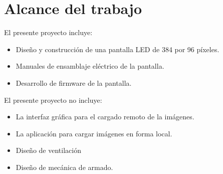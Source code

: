 \section{Alcance del trabajo}
El presente proyecto incluye:

\begin{itemize}
\item Diseño y construcción de una pantalla LED de 384 por 96 píxeles.
\item Manuales de ensamblaje eléctrico de la pantalla.
\item Desarrollo de firmware de la pantalla.


\end{itemize}

El presente proyecto no incluye:

 \begin{itemize}
\item La interfaz gráfica para el cargado remoto de la imágenes.
\item La aplicación para cargar imágenes en forma local.
\item Diseño de ventilación 
\item Diseño de mecánica de armado.

\end{itemize}




